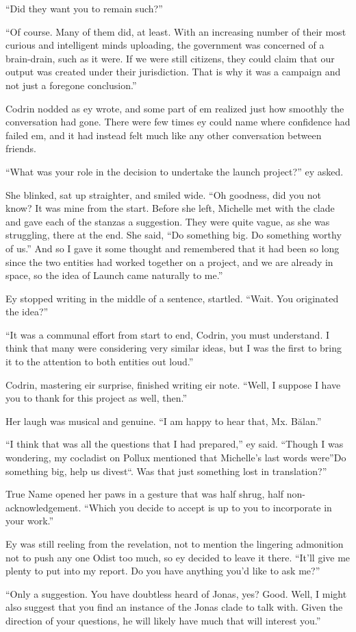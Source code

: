 ``Did they want you to remain such?''

``Of course. Many of them did, at least. With an increasing number of their most curious and intelligent minds uploading, the government was concerned of a brain-drain, such as it were. If we were still citizens, they could claim that our output was created under their jurisdiction. That is why it was a campaign and not just a foregone conclusion.''

Codrin nodded as ey wrote, and some part of em realized just how smoothly the conversation had gone. There were few times ey could name where confidence had failed em, and it had instead felt much like any other conversation between friends.

``What was your role in the decision to undertake the launch project?'' ey asked.

She blinked, sat up straighter, and smiled wide. ``Oh goodness, did you not know? It was mine from the start. Before she left, Michelle met with the clade and gave each of the stanzas a suggestion. They were quite vague, as she was struggling, there at the end. She said, ``Do something big. Do something worthy of us.'' And so I gave it some thought and remembered that it had been so long since the two entities had worked together on a project, and we are already in space, so the idea of Launch came naturally to me.''

Ey stopped writing in the middle of a sentence, startled. ``Wait. You originated the idea?''

``It was a communal effort from start to end, Codrin, you must understand. I think that many were considering very similar ideas, but I was the first to bring it to the attention to both entities out loud.''

Codrin, mastering eir surprise, finished writing eir note. ``Well, I suppose I have you to thank for this project as well, then.''

Her laugh was musical and genuine. ``I am happy to hear that, Mx. Bălan.''

``I think that was all the questions that I had prepared,'' ey said. ``Though I was wondering, my cocladist on Pollux mentioned that Michelle's last words were''Do something big, help us divest``. Was that just something lost in translation?''

True Name opened her paws in a gesture that was half shrug, half non-acknowledgement. ``Which you decide to accept is up to you to incorporate in your work.''

Ey was still reeling from the revelation, not to mention the lingering admonition not to push any one Odist too much, so ey decided to leave it there. ``It'll give me plenty to put into my report. Do you have anything you'd like to ask me?''

``Only a suggestion. You have doubtless heard of Jonas, yes? Good. Well, I might also suggest that you find an instance of the Jonas clade to talk with. Given the direction of your questions, he will likely have much that will interest you.''
